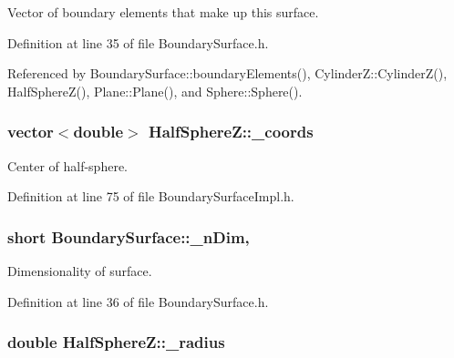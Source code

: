Vector of boundary elements that make up this surface. 



Definition at line 35 of file Boundary\+Surface.\+h.



Referenced by Boundary\+Surface\+::boundary\+Elements(), Cylinder\+Z\+::\+Cylinder\+Z(), Half\+Sphere\+Z(), Plane\+::\+Plane(), and Sphere\+::\+Sphere().

\hypertarget{classHalfSphereZ_a8e0ac10e6074199346802e399c33a984}{
\subsubsection[{\+\_\+coords}]{\setlength{\rightskip}{0pt plus 5cm}vector$<$double$>$ Half\+Sphere\+Z\+::\+\_\+coords\hspace{0.3cm}{\ttfamily [private]}}}\label{classHalfSphereZ_a8e0ac10e6074199346802e399c33a984}


Center of half-\/sphere. 



Definition at line 75 of file Boundary\+Surface\+Impl.\+h.

\hypertarget{classBoundarySurface_af3ed79310c6ba6cdc8e9f176bf463eb1}{
\subsubsection[{\+\_\+n\+Dim}]{\setlength{\rightskip}{0pt plus 5cm}short Boundary\+Surface\+::\+\_\+n\+Dim\hspace{0.3cm}{\ttfamily [protected]}, {\ttfamily [inherited]}}}\label{classBoundarySurface_af3ed79310c6ba6cdc8e9f176bf463eb1}


Dimensionality of surface. 



Definition at line 36 of file Boundary\+Surface.\+h.

\hypertarget{classHalfSphereZ_a23ff67377b4ab2432ec6fdd73187e058}{
\subsubsection[{\+\_\+radius}]{\setlength{\rightskip}{0pt plus 5cm}double Half\+Sphere\+Z\+::\+\_\+radius\hspace{0.3cm}{\ttfamily [private]}}}\label{classHalfSphereZ_a23ff67377b4ab2432ec6fdd73187e058}



